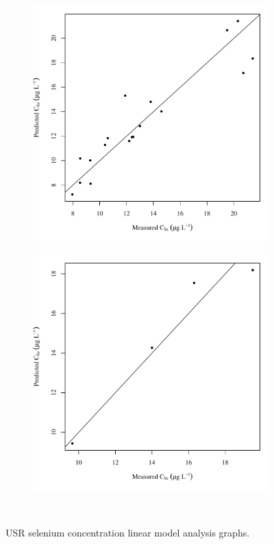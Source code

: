 \subfiguremid
\begin{landscape}
	\begin{figure}
		\begin{subfigure}{0.7\textwidth}
			\centering
			\includegraphics[width=\tableCustomSize]{"Figures/Results_USR/Stochastic/Conc Model pred v meas TIM"}
		\end{subfigure}%
		\begin{subfigure}{0.7\textwidth}
			\centering
			\includegraphics[width=\tableCustomSize]{"Figures/Results_USR/Stochastic/Conc Model pred v meas HRC"}
		\end{subfigure}\\
		\caption{USR selenium concentration linear model analysis graphs.}
	\end{figure}
\end{landscape}

